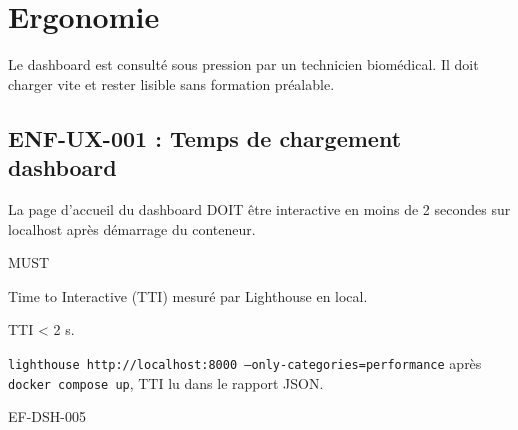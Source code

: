 \section{Ergonomie}
\label{sec:enf-ergonomie}

Le dashboard est consulté sous pression par un technicien biomédical. Il doit charger vite et rester lisible sans formation préalable.

\subsection*{ENF-UX-001 : Temps de chargement dashboard}
\begin{description}[leftmargin=2.5cm, style=nextline]
  \item[Énoncé] La page d'accueil du dashboard DOIT être interactive en moins de 2 secondes sur localhost après démarrage du conteneur.
  \item[Priorité] MUST
  \item[Métrique] Time to Interactive (TTI) mesuré par Lighthouse en local.
  \item[Cible] TTI < 2 s.
  \item[Mesure] \texttt{lighthouse http://localhost:8000 --only-categories=performance} après \texttt{docker compose up}, TTI lu dans le rapport JSON.
  \item[Lié à] EF-DSH-005
\end{description}
